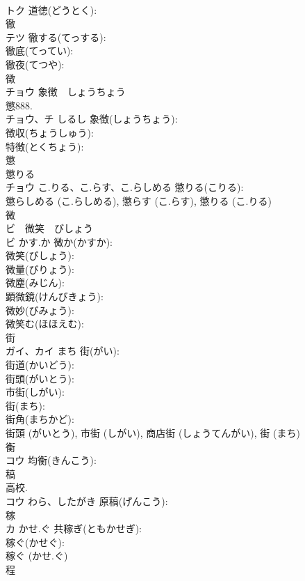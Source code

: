 \documentclass[8pt]{extreport}
\begin{document}
\begin{CJK}{UTF8}{min}
\\	トク		道徳(どうとく): 
\\	徹			
\\	テツ		徹する(てっする): 
\\	徹底(てってい): 
\\	徹夜(てつや): 
\\	徴			
\\	チョウ 象徴　しょうちょう
\\	懲888.	
\\	チョウ、チ	しるし	象徴(しょうちょう): 
\\	徴収(ちょうしゅう): 
\\	特徴(とくちょう): 
\\	懲			
\\	懲りる 
\\	チョウ	こ.りる、こ.らす、こ.らしめる	懲りる(こりる): 
\\	懲らしめる (こ.らしめる), 懲らす (こ.らす), 懲りる (こ.りる)
\\	微			
\\	ビ　微笑　びしょう
\\	ビ	かす.か	微か(かすか): 
\\	微笑(びしょう): 
\\	微量(びりょう): 
\\	微塵(みじん): 
\\	顕微鏡(けんびきょう): 
\\	微妙(びみょう): 
\\	微笑む(ほほえむ): 
\\	街			
\\	ガイ、カイ	まち	街(がい): 
\\	街道(かいどう): 
\\	街頭(がいとう): 
\\	市街(しがい): 
\\	街(まち): 
\\	街角(まちかど): 
\\	街頭 (がいとう), 市街 (しがい), 商店街 (しょうてんがい), 街 (まち)
\\	衡			
\\	コウ		均衡(きんこう): 
\\	稿			
\\	高校.
\\	コウ	わら、したがき	原稿(げんこう): 
\\	稼			
\\	カ	かせ.ぐ	共稼ぎ(ともかせぎ): 
\\	稼ぐ(かせぐ): 
\\	稼ぐ (かせ.ぐ)
\\	程			

\end{CJK}
\end{document}
